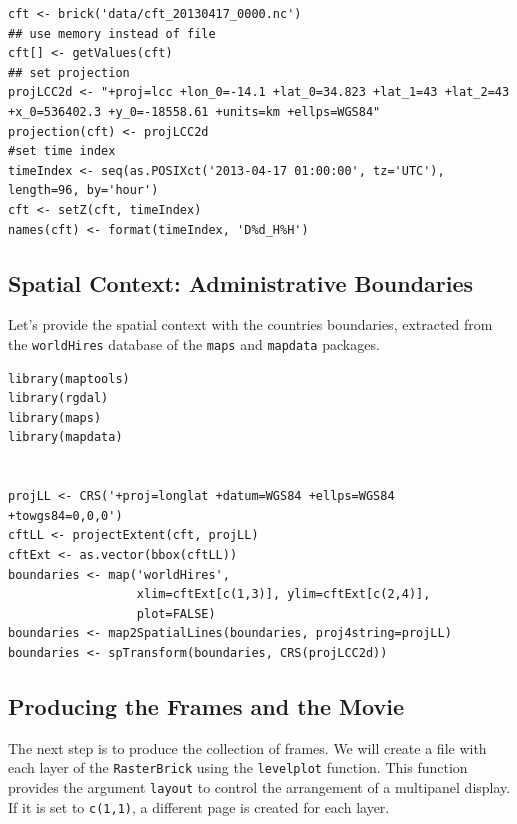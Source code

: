 \documentclass[smallroyalvopaper]{memoir}
\begin{document}
\lstset{language=R,numbers=none}
\begin{lstlisting}
cft <- brick('data/cft_20130417_0000.nc')
## use memory instead of file
cft[] <- getValues(cft)
## set projection
projLCC2d <- "+proj=lcc +lon_0=-14.1 +lat_0=34.823 +lat_1=43 +lat_2=43 +x_0=536402.3 +y_0=-18558.61 +units=km +ellps=WGS84"
projection(cft) <- projLCC2d
#set time index
timeIndex <- seq(as.POSIXct('2013-04-17 01:00:00', tz='UTC'), length=96, by='hour')
cft <- setZ(cft, timeIndex)
names(cft) <- format(timeIndex, 'D%d_H%H')
\end{lstlisting}

\subsection{Spatial Context: Administrative Boundaries}
\label{sec-5-2}
Let's provide the spatial context with the countries
boundaries, extracted from the \texttt{worldHires} database of the \texttt{maps}
and \texttt{mapdata} packages.


\lstset{language=R,numbers=none}
\begin{lstlisting}
library(maptools)
library(rgdal)
library(maps)
library(mapdata)


projLL <- CRS('+proj=longlat +datum=WGS84 +ellps=WGS84 +towgs84=0,0,0')
cftLL <- projectExtent(cft, projLL)
cftExt <- as.vector(bbox(cftLL))
boundaries <- map('worldHires',
                  xlim=cftExt[c(1,3)], ylim=cftExt[c(2,4)],
                  plot=FALSE)
boundaries <- map2SpatialLines(boundaries, proj4string=projLL)
boundaries <- spTransform(boundaries, CRS(projLCC2d))
\end{lstlisting}

\subsection{Producing the Frames and the Movie}
\label{sec-5-3}
The next step is to produce the collection of frames. We will create a
file with each layer of the \texttt{RasterBrick} using the \texttt{levelplot}
function. This function provides the argument \texttt{layout} to control the
arrangement of a multipanel display. If it is set to \texttt{c(1,1)}, a
different page is created for each layer.
\end{document}
